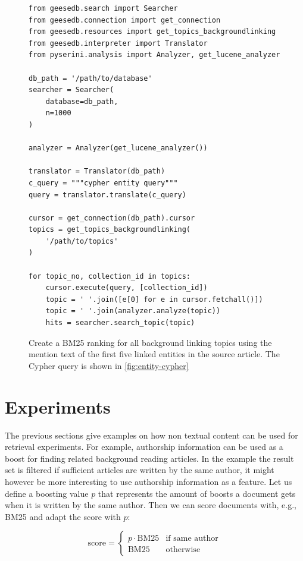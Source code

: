 \begin{figure}
	\begin{verbatim}
from geesedb.search import Searcher
from geesedb.connection import get_connection
from geesedb.resources import get_topics_backgroundlinking
from geesedb.interpreter import Translator
from pyserini.analysis import Analyzer, get_lucene_analyzer

db_path = '/path/to/database'
searcher = Searcher(
    database=db_path,
    n=1000
)

analyzer = Analyzer(get_lucene_analyzer())

translator = Translator(db_path)
c_query = """cypher entity query"""
query = translator.translate(c_query)

cursor = get_connection(db_path).cursor
topics = get_topics_backgroundlinking(
    '/path/to/topics'
)

for topic_no, collection_id in topics:
    cursor.execute(query, [collection_id])
    topic = ' '.join([e[0] for e in cursor.fetchall()]) 
    topic = ' '.join(analyzer.analyze(topic))
    hits = searcher.search_topic(topic)
	\end{verbatim}
	\caption{Create a BM25 ranking for all background linking topics using the mention text of the first five linked entities in the source article. The Cypher query is shown in \cref{fig:entity-cypher}}
	\label{fig:entities-code}
\end{figure}

\section{Experiments}
The previous sections give examples on how non textual content can be used for retrieval experiments. For example, authorship information can be used as a boost for finding related background reading articles. In the example the result set is filtered if sufficient articles are written by the same author, it might however be more interesting to use authorship information as a feature. Let us define a boosting value $p$ that represents the amount of boosts a document gets when it is written by the same author. Then we can score documents with, e.g., BM25 and adapt the score with $p$:

\begin{equation}
	\text{score} = \begin{cases}
		p \cdot \text{BM}25  & \text{if same author} \\
		\text{BM}25 & \text{otherwise}
	\end{cases}
\end{equation}

